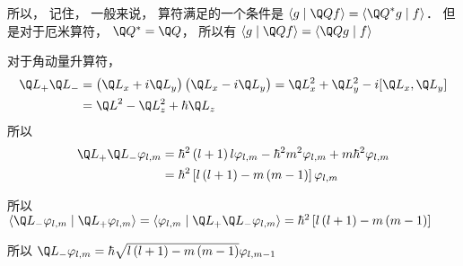
所以， 记住， 一般来说， 算符满足的一个条件是 $\left\langle {g}
 \mathrel{\left | {\vphantom {g {\Q Qf}}}
 \right. \kern-\nulldelimiterspace}
 {{\Q Qf}} \right\rangle  = \left\langle {{{{\Q Q}^ * }g}}
 \mathrel{\left | {\vphantom {{{{\Q Q}^ * }g} f}}
 \right. \kern-\nulldelimiterspace}
 {f} \right\rangle $．   但是对于厄米算符， ${\Q Q^ * } = \Q Q$，   所以有 $\left\langle {g}
 \mathrel{\left | {\vphantom {g {\Q Qf}}}
 \right. \kern-\nulldelimiterspace}
 {{\Q Qf}} \right\rangle  = \left\langle {{\Q Qg}}
 \mathrel{\left | {\vphantom {{\Q Qg} f}}
 \right. \kern-\nulldelimiterspace}
 {f} \right\rangle $  

对于角动量升算符， 
 \begin{equation}
\begin{aligned}
  {{\Q L}_ + }{{\Q L}_ - } &= \left( {{{\Q L}_x} + i{{\Q L}_y}} \right)\left( {{{\Q L}_x} - i{{\Q L}_y}} \right) = \Q L_x^2 + \Q L_y^2 - i[{{\Q L}_x},{{\Q L}_y}] \hfill \\
   &= {{\Q L}^2} - \Q L_z^2 + \hbar {{\Q L}_z} \hfill \\ 
\end{aligned} 
\end{equation}
所以
 \begin{equation}
\begin{aligned}
  {{\Q L}_ + }{{\Q L}_ - }{\varphi _{l,m}}&= {\hbar ^2}\left( {l + 1} \right)l{\varphi _{l,m}} - {\hbar ^2}{m^2}{\varphi _{l,m}} + m{\hbar ^2}{\varphi _{l,m}} \hfill \\
  & = {\hbar ^2}\left[ {l\left( {l + 1} \right) - m\left( {m - 1} \right)} \right]{\varphi _{l,m}} \hfill \\ 
\end{aligned} 
\end{equation}

所以  $\left\langle {{{{\Q L}_ - }{\varphi _{l,m}}}}
 \mathrel{\left | {\vphantom {{{{\Q L}_ - }{\varphi _{l,m}}} {{{\Q L}_ + }{\varphi _{l,m}}}}}
 \right. \kern-\nulldelimiterspace}
 {{{{\Q L}_ + }{\varphi _{l,m}}}} \right\rangle  = \left\langle {{{\varphi _{l,m}}}}
 \mathrel{\left | {\vphantom {{{\varphi _{l,m}}} {{{\Q L}_ + }{{\Q L}_ - }{\varphi _{l,m}}}}}
 \right. \kern-\nulldelimiterspace}
 {{{{\Q L}_ + }{{\Q L}_ - }{\varphi _{l,m}}}} \right\rangle  = {\hbar ^2}\left[ {l\left( {l + 1} \right) - m\left( {m - 1} \right)} \right]$  
 
所以 ${\Q L_ - }{\varphi _{l,m}} = \hbar \sqrt {l\left( {l + 1} \right) - m\left( {m - 1} \right)} {\varphi _{l,m - 1}}$ 

